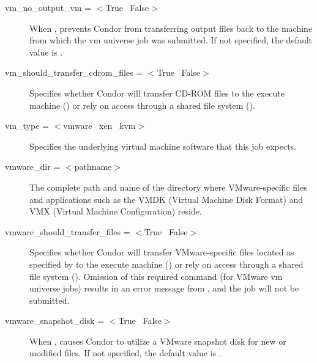 \begin{description}

\item[vm\_no\_output\_vm = $<$True \Bar\ False$>$]
When , prevents Condor from transferring output
files back to the machine from which the vm universe job
was submitted.
If not specified, the default value is .


\item[vm\_should\_transfer\_cdrom\_files = $<$True \Bar\ False$>$]
Specifies whether Condor will transfer CD-ROM files to
the execute machine () or rely on access through 
a shared file system ().


\item[vm\_type = $<$vmware \Bar\ xen \Bar\ kvm$>$]
Specifies the underlying virtual machine software that this
job expects.


\item[vmware\_dir = $<$pathname$>$]
The complete path and name of the directory where VMware-specific
files and applications such as the VMDK (Virtual Machine Disk Format) and
VMX (Virtual Machine Configuration) reside.


\item[vmware\_should\_transfer\_files = $<$True \Bar\ False$>$]
Specifies whether Condor will transfer VMware-specific files 
located as specified by  to
the execute machine () or rely on access through 
a shared file system ().
Omission of this required command (for VMware vm universe jobs)
results in an error message from , and the
job will not be submitted.


\item[vmware\_snapshot\_disk = $<$True \Bar\ False$>$]
When , causes Condor to utilize
a VMware snapshot disk for new or modified files.
If not specified, the default value is .


\end{description}
